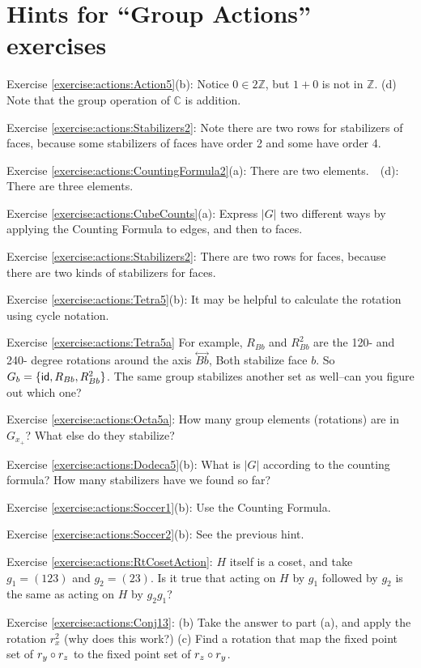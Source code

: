 \section{Hints for ``Group Actions'' exercises}\label{sec:actions:hints} 


\noindent Exercise \ref{exercise:actions:Action5}(b): Notice $0 \in 2\mathbb{Z}$, but $1+0$ is not in $\mathbb{Z}$. (d) Note that the group operation of $\mathbb{C}$ is addition.

\noindent Exercise \ref{exercise:actions:Stabilizers2}: Note there are two rows for stabilizers of faces, because some stabilizers of faces have order 2 and some have order 4.

\noindent Exercise \ref{exercise:actions:CountingFormula2}(a):   There are two elements.~~(d):   There are three elements.

\noindent Exercise \ref{exercise:actions:CubeCounts}(a):   Express $|G|$ two different ways by applying the Counting Formula to edges, and then to faces.

\noindent Exercise \ref{exercise:actions:Stabilizers2}:   There are two rows for faces, because there are two kinds of stabilizers for faces.

\noindent Exercise \ref{exercise:actions:Tetra5}(b): It may be helpful to calculate the rotation using cycle notation.

\noindent Exercise \ref{exercise:actions:Tetra5a} For example, $R_{Bb}$ and  $R_{Bb}^2$ are the 120- and 240- degree rotations around the axis $\overset{\leftrightarrow}{Bb}$, Both stabilize face $b$. So 
$G_b = \{ {\sf{i}d}, R_{Bb}, R_{Bb}^2 \}$. The same group stabilizes another set as well--can you figure out which one?  


\noindent Exercise \ref{exercise:actions:Octa5a}: How many group elements (rotations) are in $G_{x_+}$?  What else do they stabilize?

\noindent Exercise \ref{exercise:actions:Dodeca5}(b): What is $|G|$ according to the counting formula?  How many stabilizers have we found so far?

\noindent Exercise \ref{exercise:actions:Soccer1}(b): Use the Counting Formula.

\noindent Exercise \ref{exercise:actions:Soccer2}(b): See the previous hint.

\noindent Exercise \ref{exercise:actions:RtCosetAction}: $H$ itself is a coset, and take $g_1=(123)$ and $g_2=(23)$.  Is it true that acting on $H$ by $g_1$ followed by $g_2$ is the same as acting on $H$ by $g_2 g_1$?

\noindent Exercise \ref{exercise:actions:Conj13}: (b) Take the answer to part (a), and apply the rotation $r_x^2$ (why does this work?)  (c) Find a rotation that map the fixed point set of $r_y\circ r_z$ to the fixed point set of  $r_z\circ r_y$.

